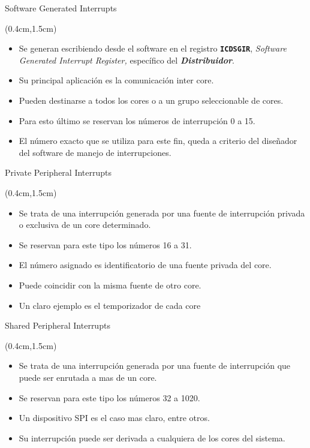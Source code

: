 \documentclass[table,x11names,aspectratio=169]{beamer}
\begin{document}
\begin{frame}[t]{Software Generated Interrupts}
 \begin{textblock*}{\textwidth}(0.4cm,1.5cm)
  \begin{itemize}[<+(1)->]\justifying \parskip 0.2cm
   \item Se generan escribiendo desde el software en el registro \texttt{\textbf{ICDSGIR}}, \textit{Software Generated Interrupt Register,} específico del \textbf{\textit{Distribuidor}}.
   \item Su principal aplicación es la comunicación inter core.
   \item Pueden destinarse a todos los cores o a un grupo seleccionable de cores. 
   \item Para esto último se reservan los números de interrupción 0 a 15.
   \item El número exacto que se utiliza para este fin, queda a criterio del diseñador del software de manejo de interrupciones.
  \end{itemize}
 \end{textblock*}
\end{frame}

\begin{frame}[t]{Private Peripheral Interrupts}
 \begin{textblock*}{\textwidth}(0.4cm,1.5cm)
  \begin{itemize}[<+(1)->]\justifying \parskip 0.2cm
   \item Se trata de una interrupción generada por una fuente de interrupción privada o exclusiva de un core determinado.
   \item Se reservan para este tipo los números 16 a 31.
   \item El número asignado es identificatorio de una fuente privada del core. 
   \item Puede coincidir con la misma fuente de otro core.
   \item Un claro ejemplo es el temporizador de cada core
  \end{itemize}
 \end{textblock*}
\end{frame}

\begin{frame}[t]{Shared Peripheral Interrupts}
 \begin{textblock*}{\textwidth}(0.4cm,1.5cm)
  \begin{itemize}[<+(1)->]\justifying \parskip 0.2cm
   \item Se trata de una interrupción generada por una fuente de interrupción que puede ser enrutada a mas de un core.
   \item Se reservan para este tipo los números 32 a 1020.
   \item Un dispositivo SPI es el caso mas claro, entre otros.
   \item Su interrupción puede ser derivada a cualquiera de los cores del sistema.
  \end{itemize}
 \end{textblock*}
\end{frame}
\end{document}
